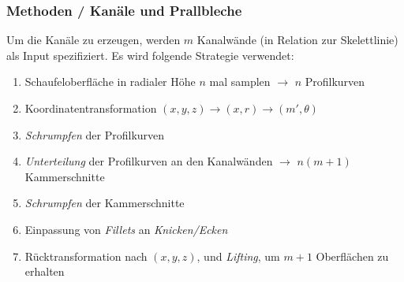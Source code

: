 \documentclass[8pt, aspectratio=169]{beamer}
\begin{document}
\begin{frame}
	\frametitle{Methoden / Kanäle und Prallbleche}
	\vspace{-1cm}\hspace{-0.5cm}
	\begin{minipage}[t]{\textwidth}
		Um die Kanäle zu erzeugen, werden $m$ Kanalwände (in Relation zur Skelettlinie) als Input spezifiziert.
		Es wird folgende Strategie verwendet:
		\begin{enumerate}
			\item Schaufeloberfläche in radialer Höhe $n$ mal samplen $\rightarrow$ $n$ Profilkurven
			\item Koordinatentransformation $(x, y, z) \rightarrow (x, r) \rightarrow (m', \theta)$
			\item \emph{Schrumpfen} der Profilkurven
			\item \emph{Unterteilung} der Profilkurven an den Kanalwänden $\rightarrow$ $n(m+1)$ Kammerschnitte 
			\item \emph{Schrumpfen} der Kammerschnitte
			\item Einpassung von \emph{Fillets} an \emph{Knicken/Ecken}
			\item Rücktransformation nach $(x, y, z)$, und \emph{Lifting}, um $m+1$ Oberflächen zu erhalten
		\end{enumerate}
	\end{minipage}
	\vfill
\end{frame}
\end{document}
